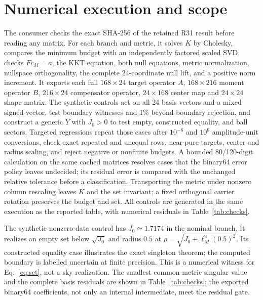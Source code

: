 \documentclass[aps,prd,onecolumn,11pt,nofootinbib,notitlepage]{revtex4-2}
\begin{document}
\section{Numerical execution and scope}

The consumer checks the exact SHA-256 of the retained R31 result before reading any matrix. For each branch and metric, it solves $K$ by Cholesky, compares the minimum budget with an independently factored scaled SVD, checks $Fc_M=a$, the KKT equation, both null equations, metric normalization, nullspace orthogonality, the complete 24-coordinate null lift, and a positive norm increment. It exports each full $168\times24$ target operator $A$, $168\times216$ moment operator $B$, $216\times24$ compensator operator, $24\times168$ center map and $24\times24$ shape matrix. The synthetic controls act on all 24 basis vectors and a mixed signed vector, test boundary witnesses and 1\% beyond-boundary rejection, and construct a generic $Y$ with $J_0>0$ to test empty, constructed equality, and ball sectors. Targeted regressions repeat those cases after $10^{-6}$ and $10^6$ amplitude-unit conversions, check exact repeated and unequal rows, near-pure targets, center and radius scaling, and reject negative or nonfinite budgets. A bounded 80/120-digit calculation on the same cached matrices resolves cases that the binary64 error policy leaves undecided; its residual error is compared with the unchanged relative tolerance before a classification. Transporting the metric under nonzero column rescaling leaves $K$ and the set invariant; a fixed orthogonal carrier rotation preserves the budget and set. All controls are generated in the same execution as the reported table, with numerical residuals in Table~\ref{tab:checks}.

\begin{table}[t]
\caption{Smallest resolved singular value, relative $Fc=a$ residuals under both declared metrics, and largest relative full-tensor basis-action residual $\max_j\epsilon_j$ for the common-metric compensator. The residual gate is $10^{-10}$ for $Fc=a$ and $10^{-9}$ for the complete tensor actions.}
\label{tab:checks}
\centering
\end{table}

The synthetic nonzero-data control has $J_0\simeq1.7174$ in the nominal branch. It realizes an empty set below $\sqrt{J_0}$ and radius $0.5$ at $\rho=\sqrt{J_0+\ell_M^2(0.5)^2}$. Its constructed equality case illustrates the exact singleton theorem; the computed boundary is labelled uncertain at finite precision. This is a numerical witness for Eq.~\eqref{eq:set}, not a sky realization. The smallest common-metric singular value and the complete basis residuals are shown in Table~\ref{tab:checks}; the exported binary64 coefficients, not only an internal intermediate, meet the residual gate.
\end{document}
